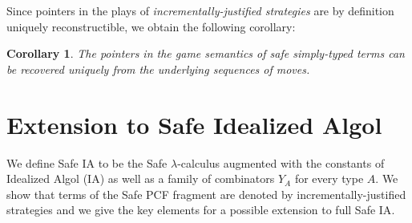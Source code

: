 \documentclass{ouclprgsc}
\newtheorem{cor}{Corollary}
\begin{document}
Since pointers in the plays of \emph{incrementally-justified
strategies} are by definition uniquely reconstructible, we obtain
the following corollary:

\begin{cor}
\label{cor:safeptrrecover} The pointers in the game semantics of
safe simply-typed terms can be recovered uniquely from the
underlying sequences of moves.
\end{cor}

\section{Extension to Safe Idealized Algol}

We define Safe \textsf{IA} to be the Safe $\lambda$-calculus
augmented with the constants of Idealized Algol (\textsf{IA})
\cite{Reynolds81} as well as a family of combinators $Y_A$ for every
type $A$. We show that terms of the Safe \textsf{PCF}
\cite{DBLP:journals/tcs/Plotkin77} fragment are denoted by
incrementally-justified strategies and we give the key elements for
a possible extension to full Safe \textsf{IA}.



\end{document}

